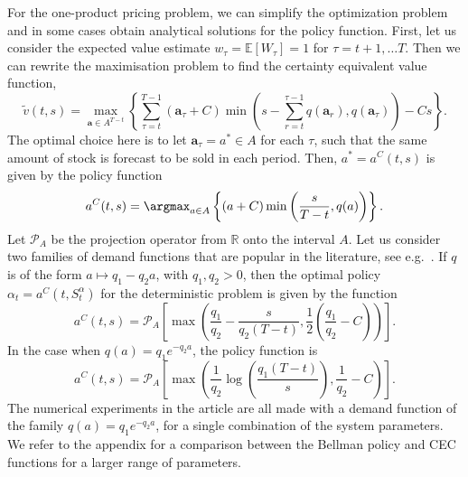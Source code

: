 \documentclass[main.tex]{subfiles}
\begin{document}
For the one-product pricing problem, we can simplify the optimization
problem and in some cases obtain analytical solutions for the policy function.
First, let us consider the expected value estimate $w_\tau=\mathbb E
[W_\tau]=1$ for $\tau=t+1,\dots T$.
Then we can rewrite the maximisation problem to find
the certainty equivalent value function,
\begin{equation}
  \widetilde{v}(t,s)=
  \max_{\mathbf a\in A^{T-t}}\left\{\sum_{\tau=t}^{T-1}(\mathbf
    a_\tau+C)\min\left(s-\sum_{r=t}^{\tau-1}q(\mathbf a_r),q(\mathbf a_\tau)\right)-Cs\right\}.
\end{equation}
The optimal choice here is to let $\mathbf a_\tau=a^*\in A$ for each
$\tau$, such that the same amount of stock is forecast to be sold in
each period.
Then, $a^*=a^C(t,s)$ is given by the policy function
\begin{equation}
  a^C(t,s)=\argmax_{a\in A} \left\{(a+C)\min\left(
      \frac{s}{T-t},q(a)
    \right)\right\}.
\end{equation}
Let $\mathcal P_A$ be the projection operator from $\mathbb R$ onto the interval $A$.
Let us consider two families of demand functions that are
popular in the literature, see e.g.~\citet[Ch.~7]{talluri2006theory}.
If $q$ is of the form $a\mapsto q_1-q_2a$, with $q_1,q_2> 0$, then
the optimal policy $\alpha_t=a^C(t,S_t^\alpha)$ for the deterministic
problem is given by the function
\begin{equation}
  a^C(t,s)=\mathcal P_A \left[ \max\left(
      \frac{q_1}{q_2}-\frac{s}{q_2(T-t)},\frac{1}{2}\left(\frac{q_1}{q_2}-C
      \right) \right) \right].
\end{equation}
In the case when $q(a)=q_1e^{-q_2a}$, the policy function is
\begin{equation}\label{eq:cec_policy}
  a^C(t,s)=\mathcal P_A\left[
    \max\left( \frac{1}{q_2}\log\left( \frac{q_1(T-t)}{s}\right),
      \frac{1}{q_2}-C  \right)\right].
\end{equation}
The numerical experiments in the article are all made
with a demand function of the family $q(a)=q_1e^{-q_2a}$,  for a
single combination of the  system
parameters. We refer to the appendix for a
comparison between the Bellman policy and CEC functions for a larger
range of parameters.
\end{document}
